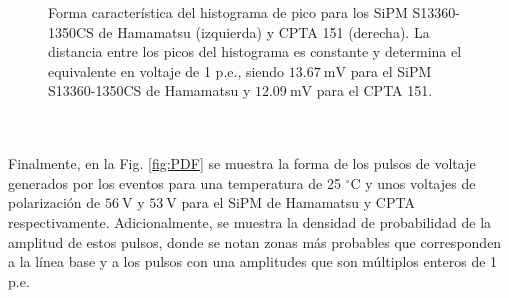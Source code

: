 \begin{figure}[h!]
\begin{subfigure}[b]{0.49\textwidth}
         \caption{}
         \label{fig:peak_CPTA}
     \end{subfigure}
        \caption{Forma característica del histograma de pico para los SiPM S13360-1350CS de Hamamatsu (izquierda) y CPTA 151 (derecha). La distancia entre los picos del histograma es constante y determina el equivalente en voltaje de 1 p.e., siendo $13.67~\mbox{mV}$ para el SiPM S13360-1350CS de Hamamatsu y $12.09~\mbox{mV}$ para el CPTA 151.}
        \label{fig:peak}
\end{figure}
\\ \\
Finalmente, en la Fig. \ref{fig:PDF} se muestra la forma de los pulsos de voltaje generados por los eventos para una temperatura de 25 $^\circ$C y unos voltajes de polarización de $56~\mbox{V}$ y $53~\mbox{V}$ para el SiPM de Hamamatsu y CPTA respectivamente. Adicionalmente, se muestra la densidad de probabilidad de la amplitud de estos pulsos, donde se notan zonas más probables que corresponden a la línea base y a los pulsos con una amplitudes que son múltiplos enteros de 1 p.e.  
